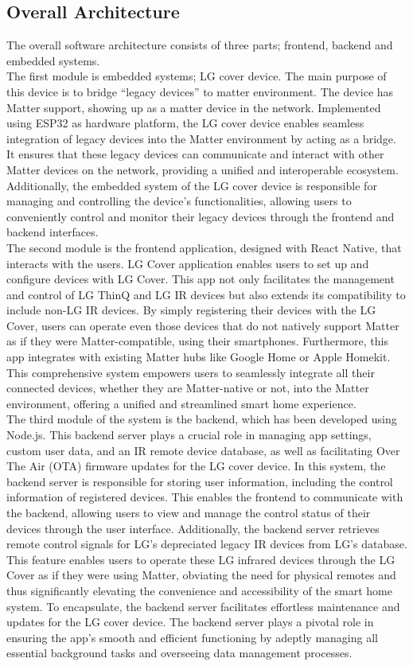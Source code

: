 \documentclass[conference]{IEEEtran}
\begin{document}
\subsection{\large{Overall Architecture}}
The overall software architecture consists of three parts; frontend, backend and embedded systems.\\
The first module is embedded systems; LG cover device. The main purpose of this device is to bridge “legacy devices” to matter environment. The device has Matter support, showing up as a matter device in the network. Implemented using ESP32 as hardware platform, the LG cover device enables seamless integration of legacy devices into the Matter environment by acting as a bridge. It ensures that these legacy devices can communicate and interact with other Matter devices on the network, providing a unified and interoperable ecosystem. Additionally, the embedded system of the LG cover device is responsible for managing and controlling the device's functionalities, allowing users to conveniently control and monitor their legacy devices through the frontend and backend interfaces.\\
The second module is the frontend application, designed with React Native, that interacts with the users. LG Cover application enables users to set up and configure devices with LG Cover. This app not only facilitates the management and control of LG ThinQ and LG IR devices but also extends its compatibility to include non-LG IR devices. By simply registering their devices with the LG Cover, users can operate even those devices that do not natively support Matter as if they were Matter-compatible, using their smartphones. Furthermore, this app integrates with existing Matter hubs like Google Home or Apple Homekit. This comprehensive system empowers users to seamlessly integrate all their connected devices, whether they are Matter-native or not, into the Matter environment, offering a unified and streamlined smart home experience.\\
The third module of the system is the backend, which has been developed using Node.js. This backend server plays a crucial role in managing app settings, custom user data, and an IR remote device database, as well as facilitating Over The Air (OTA) firmware updates for the LG cover device. In this system, the backend server is responsible for storing user information, including the control information of registered devices. This enables the frontend to communicate with the backend, allowing users to view and manage the control status of their devices through the user interface. Additionally, the backend server retrieves remote control signals for LG's depreciated legacy IR devices from LG's database. This feature enables users to operate these LG infrared devices through the LG Cover as if they were using Matter, obviating the need for physical remotes and thus significantly elevating the convenience and accessibility of the smart home system. To encapsulate, the backend server facilitates effortless maintenance and updates for the LG cover device. The backend server plays a pivotal role in ensuring the app's smooth and efficient functioning by adeptly managing all essential background tasks and overseeing data management processes.\\
\end{document}
